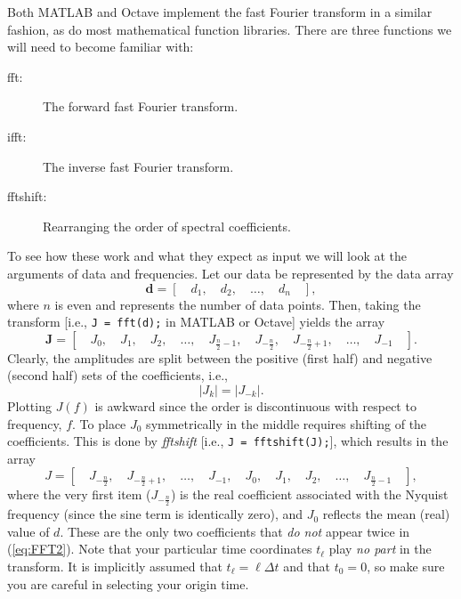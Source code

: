Both MATLAB and Octave implement the fast Fourier transform in a similar fashion, as do most mathematical function libraries.  There are three
functions we will need to become familiar with:
\begin{description}
	\item [fft:] The forward fast Fourier transform.
	\item [ifft:] The inverse fast Fourier transform.
	\item [fftshift:] Rearranging the order of spectral coefficients.
\end{description}
To see how these work and what they expect as input we will look at the arguments of data and frequencies.
Let our data be represented by the data array
\begin{equation}
\mathbf{d} = [ \quad d_1, \quad d_2, \quad \ldots, \quad d_n \quad ],
\end{equation}
where $n$ is even and represents the number of data points.  Then, taking the transform [i.e., \texttt{J = fft(d);} in MATLAB or Octave] yields the array
\begin{equation}
\mathbf{J} = [ \quad J_0, \quad J_1, \quad J_2, \quad \ldots, \quad J_{\frac{n}{2}-1}, \quad J_{-\frac{n}{2}}, \quad J_{-\frac{n}{2}+1}, \quad \ldots, \quad J_{-1} \quad ].
\label{eq:FFT2}
\end{equation}
Clearly, the amplitudes are split between the positive (first half) and negative (second half) sets of the coefficients, i.e.,
\begin{equation}
| J_k | = | J_{-k} |.
\end{equation}
Plotting $J(f)$ is awkward since the order is discontinuous with respect to frequency, $f$.  To place $J_0$ symmetrically
in the middle requires shifting of the coefficients.  This is done by \emph{fftshift} [i.e., \texttt{J = fftshift(J);}], which results in the array
\begin{equation}
J = [ \quad J_{-\frac{n}{2}}, \quad J_{-\frac{n}{2}+1}, \quad \ldots, \quad J_{-1}, \quad J_0, \quad J_1, \quad J_2, \quad \ldots, \quad J_{\frac{n}{2}-1} \quad ],
\end{equation}
where the very first item ($J_{-\frac{n}{2}}$) is the real coefficient associated with the Nyquist frequency (since the
sine term is identically zero), and $J_0$ reflects the mean (real) value of $d$.  These are the only two coefficients
that \emph{do not} appear twice in (\ref{eq:FFT2}).
Note that your particular time coordinates $t_{\ell}$ play \emph{no part} in the transform.  It is implicitly assumed that
$t_{\ell} = {\ell}\Delta t$ and that $t_0 = 0$, so make sure you are careful in selecting your origin time.

